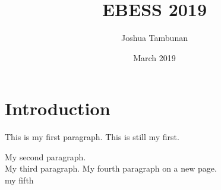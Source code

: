 \documentclass{article}
\title{EBESS 2019}
\author{Joshua Tambunan}
\date{March 2019}
\begin{document}
\maketitle
\section{Introduction}

This is my first paragraph.
This is still my first.

My second paragraph.\\ %
\indent My third paragraph.
\newpage %
My fourth paragraph on a new page. \\
my fifth

\begin{comment}
    Multi line comment
    I can say whatever I want
    without worrying about compile errors
    \fakecommand
    Johnno is a good bloke
\end{comment}

\begin{thebibliography}{}
\bibitem{}

\end{thebibliography}
\end{document}
